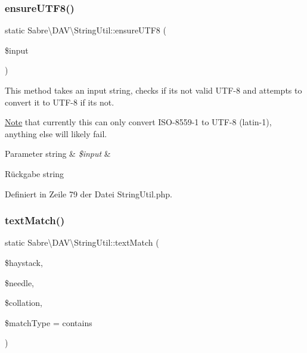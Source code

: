 \subsubsection{\texorpdfstring{ensure\+U\+T\+F8()}{ensureUTF8()}}
{\footnotesize\ttfamily static Sabre\textbackslash{}\+D\+A\+V\textbackslash{}\+String\+Util\+::ensure\+U\+T\+F8 (\begin{DoxyParamCaption}\item[{}]{\$input }\end{DoxyParamCaption})\hspace{0.3cm}{\ttfamily [static]}}

This method takes an input string, checks if it\textquotesingle{}s not valid U\+T\+F-\/8 and attempts to convert it to U\+T\+F-\/8 if it\textquotesingle{}s not.

\mbox{\hyperlink{class_note}{Note}} that currently this can only convert I\+S\+O-\/8559-\/1 to U\+T\+F-\/8 (latin-\/1), anything else will likely fail.


\begin{DoxyParams}[1]{Parameter}
string & {\em \$input} & \\
\hline
\end{DoxyParams}
\begin{DoxyReturn}{Rückgabe}
string 
\end{DoxyReturn}


Definiert in Zeile 79 der Datei String\+Util.\+php.

\mbox{\label{class_sabre_1_1_d_a_v_1_1_string_util_a460ccddb1d59d9119e571aba5cf91278}} 
\subsubsection{\texorpdfstring{text\+Match()}{textMatch()}}
{\footnotesize\ttfamily static Sabre\textbackslash{}\+D\+A\+V\textbackslash{}\+String\+Util\+::text\+Match (\begin{DoxyParamCaption}\item[{}]{\$haystack,  }\item[{}]{\$needle,  }\item[{}]{\$collation,  }\item[{}]{\$match\+Type = {\ttfamily \textquotesingle{}contains\textquotesingle{}} }\end{DoxyParamCaption})\hspace{0.3cm}{\ttfamily [static]}}


